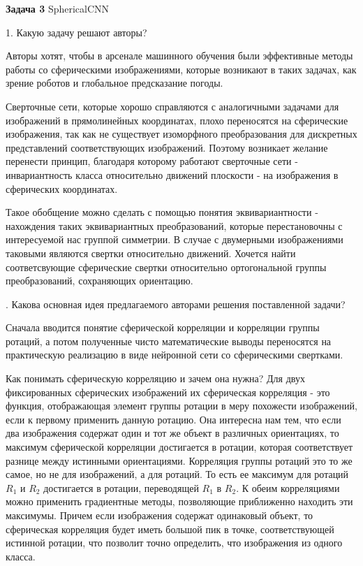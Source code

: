 \documentclass[10pt]{article}
\begin{document}
	\bigskip
	
\textbf{Задача 3}
\medskip
SphericalCNN
\medskip

1. Какую задачу решают авторы?
\medskip

Авторы хотят, чтобы в арсенале машинного обучения были эффективные методы работы со сферическими изображениями, которые возникают в таких задачах, как зрение роботов и глобальное предсказание погоды.

Сверточные сети, которые хорошо справляются с аналогичными задачами для изображений в прямолинейных координатах, плохо переносятся на сферические изображения, так как не существует изоморфного преобразования для дискретных представлений соответствующих изображений. Поэтому возникает желание перенести принцип, благодаря которому работают сверточные сети - инвариантность класса относительно движений плоскости - на изображения в сферических координатах.

Такое обобщение можно сделать с помощью понятия эквивариантности - нахождения таких эквивариантных  преобразований, которые перестановочны с интересуемой нас группой симметрии. В случае с двумерными изображениями таковыми являются свертки относительно движений. Хочется найти соответсвующие сферические свертки относительно ортогональной группы преобразований, сохраняющих ориентацию.

. Какова основная идея предлагаемого авторами решения поставленной задачи?
\medskip

Сначала вводится понятие сферической корреляции и корреляции группы ротаций, а потом полученные чисто математические выводы переносятся на практическую реализацию в виде нейронной сети со сферическими свертками.

Как понимать сферическую корреляцию и зачем она нужна? Для двух фиксированных сферических изображений их сферическая корреляция - это функция, отображающая элемент группы ротации в меру похожести изображений, если к первому применить данную ротацию. Она интересна нам тем, что если два изображения содержат один и тот же объект в различных ориентациях, то максимум сферической корреляции достигается в ротации, которая соответствует разнице между истинными ориентациями. Корреляция группы ротаций это то же самое, но не для изображений, а для ротаций. То есть ее максимум для ротаций $R_1$ и $R_2$ достигается в ротации, переводящей $R_1$ в $R_2$. К обеим корреляциями можно применить градиентные методы, позволяющие приближенно находить эти максимумы. Причем если изображения содержат одинаковый объект, то сферическая корреляция будет иметь большой пик в точке, соответствующей истинной ротации, что позволит точно определить, что изображения из одного класса.
\end{document}
